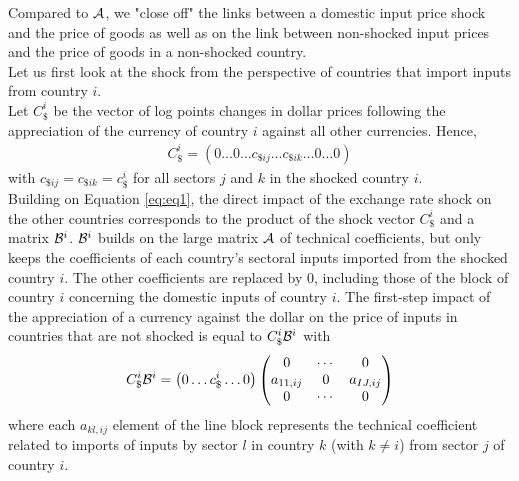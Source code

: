\documentclass[11pt,a4paper]{article}
\begin{document}
Compared to $\cal A$, we "close off" the links between a domestic input price shock and the price of goods as well as on the link between non-shocked input prices and the price of goods in a non-shocked country.\\
Let us first look at the shock from the perspective of countries that import inputs from country $i$.\\
Let $C_\$^i$ be the vector of log points changes in dollar prices following the 
appreciation of the currency of country $i$ against all other currencies.
Hence,
\begin{eqnarray*}
C_\$^i=\left(0\ldots0\ldots c_{\$ij}\ldots c_{\$ik}\dots 0\ldots0\right)
\end{eqnarray*}
with $c_{\$ij}=c_{\$ik}=c_\$^i
$
for all sectors $j$ and $k$ in the shocked country $i$.\\
Building on Equation \ref{eq:eq1}, the direct impact of the exchange rate shock on the other countries corresponds to the product of the shock vector $C_\$^i$ and a matrix ${\cal B}^i$. 
${\cal B}^i$ builds on the large matrix ${\cal A}$ of technical coefficients, but only keeps the coefficients of each country's sectoral inputs imported from the shocked country $i$. The other coefficients are replaced by 0, including those of the block of country $i$ concerning the domestic inputs of country $i$. 
The first-step impact of the appreciation of a currency against the dollar on the price of inputs in countries that are not shocked is equal to $C_\$^i{\cal B}^i$ with
\begin{eqnarray}
C_\$^i{\cal B}^i=\left(0\ldots c_\$^i \ldots 0\right)\left(\begin{matrix}0&\cdots&0\\a_{11,ij}&0&a_{IJ,ij}\\0&\cdots&0\\\end{matrix}\right) 	
\label{eq:eq3}
\end{eqnarray}
where each $a_{kl,ij}$ element of the line block represents the technical coefficient related to imports of inputs by sector $l$ in country $k$ (with $k\ne i$) from sector $j$ of country $i$.\\
\end{document}
